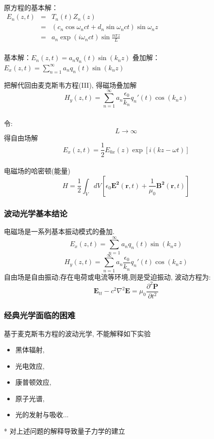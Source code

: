 \begin{frame}
    \frametitle{} 
    ~\\
    原方程的基本解：\\ {\vspace*{0.3em}}
	$\begin{array}{llll}
		E_n (z,t) &=& T_n(t)Z_n(z)\\
		&=& (c_n\cos \omega_nct+ d_n\sin \omega _nct ) \sin \omega_n z\\
        &=&a_n \exp(i \omega_n ct) \sin \frac{ n\pi z}{L} \\
	\end{array}$ \\  {\vspace*{0.6em}}    
    \begin{enumerate}
    \IItem 基本解：$\displaystyle E_{n}(z,t) = a_n q_n (t) \sin (k_n z) $
    \IItem 叠加解：$\displaystyle E_{x}(z,t) = \sum\limits_{n=1}^{\infty } a_n q_n (t) \sin (k_n z)$
    \end{enumerate}	
    把解代回由麦克斯韦方程(III), 得磁场叠加解 \\ 
    \[ H_{y}(z,t) = \sum\limits_{n=1}^{\infty } a_n \frac{\epsilon_0}{k_n}q_n ' (t) \cos (k_n z)\] 
\end{frame}

\begin{frame}
      \frametitle{}
    令: 
    \[  L \to \infty \]
    得自由场解 
    \[  E_{x}(z,t) = \frac{1}{2} E_{0x}(z) \exp [i(kz-\omega t)] \]
    ~~\\ 
    电磁场的哈密顿(能量)
    \[ H = \frac{1}{2} \int_V d V \left[ \epsilon_0 \mathbf{E^2}(\mathbf{r},t) + \frac{1}{\mu_0}\mathbf{B^2}(\mathbf{r},t)\right]\]
\end{frame}

\begin{frame} 
\frametitle{波动光学基本结论}
    电磁场是一系列基本振动模式的叠加.\\ 
    \[ E_{x}(z,t) = \sum\limits_{n=1}^{\infty } a_n q_n (t) \sin (k_n z)\]
    \[ H_{y}(z,t) = \sum\limits_{n=1}^{\infty } a_n \frac{\epsilon_0}{k_n}q_n ' (t) \cos (k_n z)\] 
    自由场是自由振动;存在电荷或电流等环境,则是受迫振动, 波动方程为:
    \[\mathbf{E}_{tt} -c^2\nabla^2 \mathbf{E} = \mu_0 \frac{\partial ^2 \mathbf{P}  }{\partial t^2}\]  
\end{frame}

\begin{frame}
      \frametitle{经典光学面临的困难}
      基于麦克斯韦方程的波动光学, 不能解释如下实验
      \begin{itemize}
          \item 黑体辐射, 
          \item 光电效应, 
          \item 康普顿效应, 
          \item 原子光谱, 
          \item 光的发射与吸收...
      \end{itemize}
      * 对上述问题的解释导致量子力学的建立
\end{frame}

